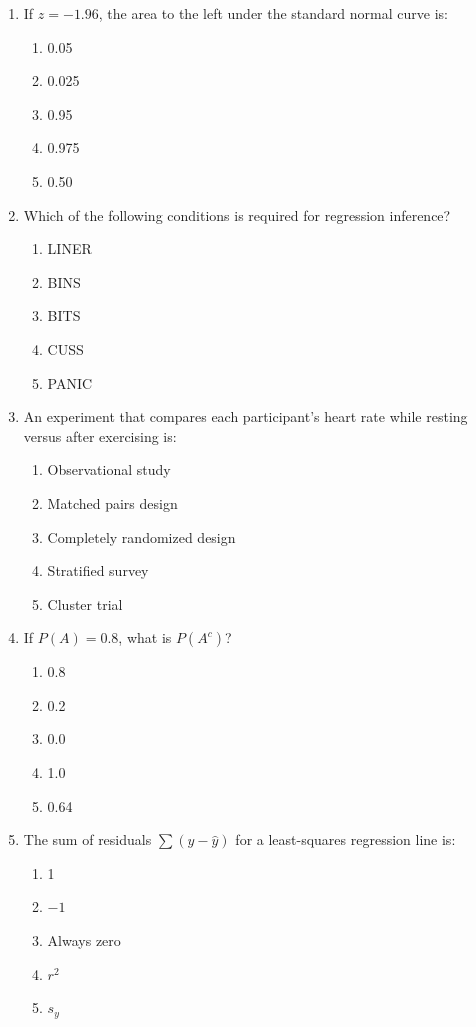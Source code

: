 \begin{enumerate}[resume, leftmargin=1.5em]
  \item If $z = -1.96$, the area to the left under the standard normal curve is:
  \begin{enumerate}[label=(\Alph*)]
    \item 0.05 \item 0.025 \item 0.95 \item 0.975 \item 0.50
  \end{enumerate}

  \item Which of the following conditions is required for regression inference?
  \begin{enumerate}[label=(\Alph*)]
    \item LINER \item BINS \item BITS \item CUSS \item PANIC
  \end{enumerate}

  \item An experiment that compares each participant's heart rate while resting versus after exercising is:
  \begin{enumerate}[label=(\Alph*)]
    \item Observational study \item Matched pairs design \item Completely randomized design \item Stratified survey \item Cluster trial
  \end{enumerate}

  \item If $P(A) = 0.8$, what is $P(A^c)$?
  \begin{enumerate}[label=(\Alph*)]
    \item 0.8 \item 0.2 \item 0.0 \item 1.0 \item 0.64
  \end{enumerate}

  \item The sum of residuals $\sum(y - \hat{y})$ for a least-squares regression line is:
  \begin{enumerate}[label=(\Alph*)]
    \item 1 \item $-1$ \item Always zero \item $r^2$ \item $s_y$
  \end{enumerate}


\end{enumerate}
